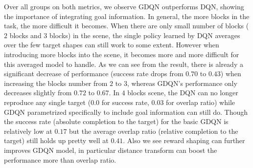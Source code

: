 \documentclass{article} %
\begin{document}
Over all groups on both metrics, we observe GDQN outperforms DQN, showing the importance of integrating goal information. In general, the more blocks in the task, the more difficult it becomes. When there are only small number of blocks ($2$ blocks and $3$ blocks) in the scene, the single policy learned by DQN averages over the few target shapes can still work to some extent. However when introducing more blocks into the scene, it becomes more and more difficult for this averaged model to handle. As we can see from the result, there is already a significant decrease of performance (success rate drops from $0.70$ to $0.43$) when increasing the blocks number from $2$ to $3$, whereas GDQN's performance only decreases slightly from $0.72$ to $0.67$. In $4$ blocks scene, the DQN can no longer reproduce any single target ($0.0$ for success rate, $0.03$ for overlap ratio) while GDQN parametrized specifically to include goal information can still do. Though the success rate (absolute completion to the target) for the basic GDQN is relatively low at $0.17$ but the average overlap ratio (relative completion to the target) still holds up pretty well at $0.41$. Also we see reward shaping can further improves GDQN model, in particular distance transform can boost the performance more than overlap ratio.
\end{document}
